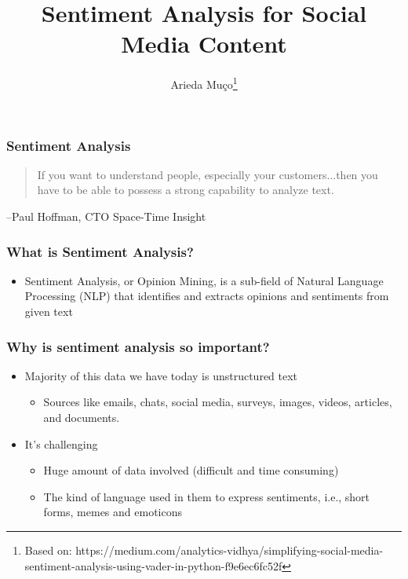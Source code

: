 \documentclass[compress, aspectratio=54]{beamer}
\title[Sentiment Analysis]{Sentiment Analysis for Social Media Content}
\author[Arieda Mu\c co]{Arieda Mu\c co\footnote{Based on: https://medium.com/analytics-vidhya/simplifying-social-media-sentiment-analysis-using-vader-in-python-f9e6ec6fc52f}}
\institute[CEU]{Central European University}
\date{}
\begin{document}
\captionsetup[subfigure]{labelformat=empty}

\frame{\titlepage}



\begin{frame}
\frametitle{Sentiment Analysis}

\begin{quote}
If you want to understand people, especially your customers...then you have to be able to possess a strong capability to analyze text.
\end{quote}
\begin{flushright}
--Paul Hoffman, CTO Space-Time Insight
\end{flushright}

\end{frame}



\begin{frame}

\frametitle{What is Sentiment Analysis?}
\begin{itemize}
\item Sentiment Analysis, or Opinion Mining, is a sub-field of Natural Language Processing (NLP) that identifies and extracts opinions and sentiments from given text

\end{itemize}
\end{frame}

\begin{frame}

\frametitle{Why is sentiment analysis so important?}
\begin{itemize}
\item Majority of this data we have today is unstructured text
\begin{itemize}
\item Sources like emails, chats, social media, surveys, images, videos, articles, and documents. 
\end{itemize}
\item It's challenging
\begin{itemize}

 \item Huge amount of data involved (difficult and time consuming)
 \item The kind of language used in them to express sentiments, i.e., short forms, memes and emoticons
 \end{itemize}
\end{itemize}
\end{frame}
\end{document}

